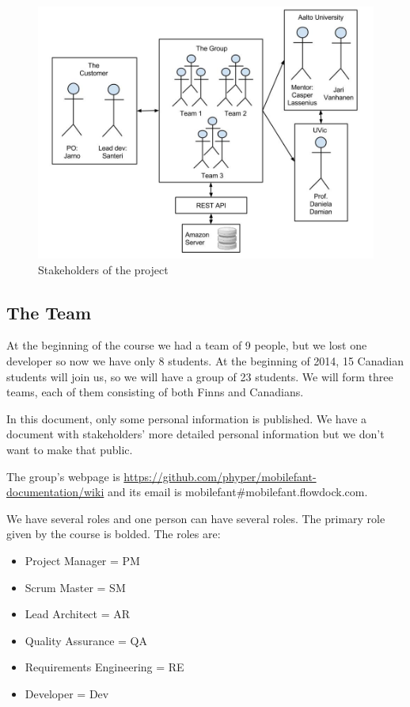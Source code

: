 \begin{figure}[H]
\centering
\includegraphics[width=1\textwidth]{imgs/stakeholders.jpg}
\caption{Stakeholders of the project}
\label{fig:stakeholders}
\end{figure}

\subsection{The Team}

At the beginning of the course we had a team of 9 people, but we lost one
developer so now we have only 8 students. At the beginning of 2014, 15 Canadian
students will join us, so we will have a group of 23 students. We will form
three teams, each of them consisting of both Finns and Canadians.

In this document, only some personal information is published. We have a
document with stakeholders' more detailed personal information but we don't
want to make that public.

The group's webpage is
\href{https://github.com/phyper/mobilefant-documentation/wiki}{https://github.com/phyper/mobilefant-documentation/wiki}
and its email is mobilefant\#mobilefant.flowdock.com.

We have several roles and one person can have several roles. The primary role
given by the course is bolded. The roles are:

\begin{itemize}
  \item Project Manager = PM
  \item Scrum Master = SM
  \item Lead Architect = AR
  \item Quality Assurance = QA
  \item Requirements Engineering = RE
  \item Developer = Dev
\end{itemize}


